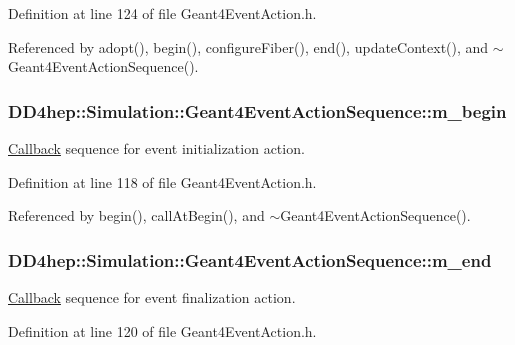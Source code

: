 Definition at line 124 of file Geant4EventAction.h.

Referenced by adopt(), begin(), configureFiber(), end(), updateContext(), and $\sim$Geant4EventActionSequence().\hypertarget{class_d_d4hep_1_1_simulation_1_1_geant4_event_action_sequence_a59a49de5aff7aac8379f5325e2584ad6}{
\subsubsection[{m\_\-begin}]{ {\bf DD4hep::Simulation::Geant4EventActionSequence::m\_\-begin}}}
\label{class_d_d4hep_1_1_simulation_1_1_geant4_event_action_sequence_a59a49de5aff7aac8379f5325e2584ad6}


\hyperlink{class_d_d4hep_1_1_callback}{Callback} sequence for event initialization action. 

Definition at line 118 of file Geant4EventAction.h.

Referenced by begin(), callAtBegin(), and $\sim$Geant4EventActionSequence().\hypertarget{class_d_d4hep_1_1_simulation_1_1_geant4_event_action_sequence_ae633e2bffea90162cc1081deca8c395c}{
\subsubsection[{m\_\-end}]{ {\bf DD4hep::Simulation::Geant4EventActionSequence::m\_\-end}}}
\label{class_d_d4hep_1_1_simulation_1_1_geant4_event_action_sequence_ae633e2bffea90162cc1081deca8c395c}


\hyperlink{class_d_d4hep_1_1_callback}{Callback} sequence for event finalization action. 

Definition at line 120 of file Geant4EventAction.h.

